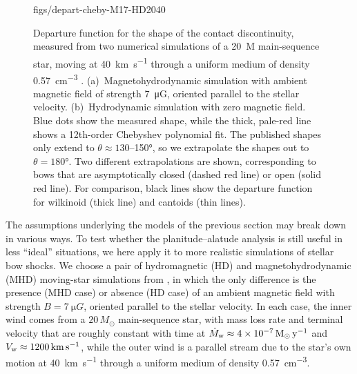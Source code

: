 \begin{figure}
  {figs/depart-cheby-M17-HD2040}\\[-\baselineskip]
  \caption[]{Departure function for the shape of the contact
    discontinuity, measured from two numerical simulations of a
    \SI{20}{M_\odot} main-sequence star, moving at \SI{40}{km.s^{-1}}
    through a uniform medium of density \SI{0.57}{cm^{-3}}
    \citep{Meyer:2017a}. (a)~Magnetohydrodynamic simulation with
    ambient magnetic field of strength \SI{7}{\micro G}, oriented
    parallel to the stellar velocity. (b)~Hydrodynamic simulation with
    zero magnetic field.  Blue dots show the measured shape, while the
    thick, pale-red line shows a 12th-order Chebyshev polynomial fit.
    The published shapes only extend to
    \(\theta \approx 130\)--\ang{150}, so we extrapolate the shapes out to
    \(\theta = \ang{180}\). Two different extrapolations are shown,
    corresponding to bows that are asymptotically closed (dashed red
    line) or open (solid red line).  For comparison, black lines show
    the departure function for wilkinoid (thick line) and cantoids
    (thin lines).}
  \label{fig:sim-depart}
\end{figure}

The assumptions underlying the models of the previous section may
break down in various ways.  To test whether the planitude--alatude
analysis is still useful in less ``ideal'' situations, we here apply
it to more realistic simulations of stellar bow shocks.  We choose a
pair of hydromagnetic (HD) and magnetohydrodynamic (MHD) moving-star
simulations from \citet{Meyer:2017a}, in which the only difference is
the presence (MHD case) or absence (HD case) of an ambient magnetic
field with strength \(B = \SI{7}{\micro G}\), oriented parallel to the
stellar velocity.  In each case, the inner wind comes from a
\(20\,M_\odot\) main-sequence star, with mass loss rate and terminal
velocity that are roughly constant with time at
\(\dot{M}_{\mathrm{w}} \approx \SI{4e-7}{M_\odot.y^{-1}}\) and
\(V_{\mathrm{w}} \approx \SI{1200}{km.s^{-1}}\), while the outer wind is a
parallel stream due to the star's own motion at \SI{40}{km.s^{-1}}
through a uniform medium of density \SI{0.57}{cm^{-3}}.

